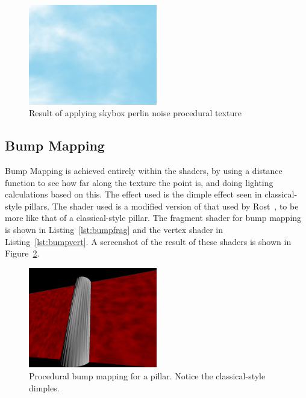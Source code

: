 

\begin{figure}
  \centering
  \includegraphics[width=0.5\textwidth]{images/sky}
  \caption{Result of applying skybox perlin noise procedural texture}
  \label{fig:sky}
\end{figure}


\subsection{Bump Mapping}
Bump Mapping is achieved entirely within the shaders, by using a distance function to see how far along the texture the point is, and doing lighting calculations based on this.
The effect used is the dimple effect seen in classical-style pillars.
The shader used is a modified version of that used by Rost~\cite{rost2006opengl}, to be more like that of a classical-style pillar.
The fragment shader for bump mapping is shown in Listing~\ref{lst:bumpfrag} and the vertex shader in Listing~\ref{lst:bumpvert}.
A screenshot of the result of these shaders is shown in Figure~\ref{fig:bumpmapping}.



\begin{figure}
  \centering
  \includegraphics[width=0.5\textwidth]{images/pillar}
  \caption{Procedural bump mapping for a pillar. Notice the classical-style dimples.}
  \label{fig:bumpmapping}
\end{figure}


